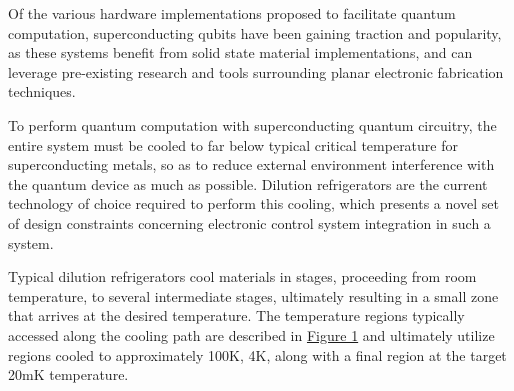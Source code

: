 Of the various hardware implementations proposed to facilitate quantum computation, superconducting qubits have been gaining traction and popularity, as these systems benefit from solid state material implementations, and can leverage pre-existing research and tools surrounding planar electronic fabrication techniques.

To perform quantum computation with superconducting quantum circuitry, the entire system must be cooled to far below typical critical temperature for superconducting metals, so as to reduce external environment interference with the quantum device as much as possible. Dilution refrigerators are the current technology of choice required to perform this cooling, which presents a novel set of design constraints concerning electronic control system integration in such a system.

Typical dilution refrigerators cool materials in stages, proceeding from room temperature, to several intermediate stages, ultimately resulting in a small zone that arrives at the desired temperature. The temperature regions typically accessed along the cooling path are described in \hyperref[fig:fridge]{Figure 1} and ultimately utilize regions cooled to approximately 100K, 4K, along with a final region at the target 20mK temperature. 

